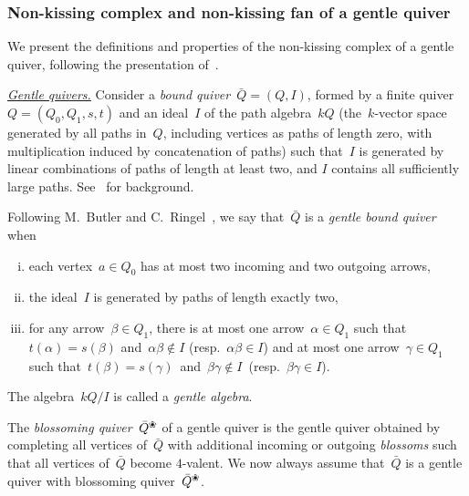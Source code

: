 \documentclass{amsart}
\theoremstyle{definition}
\newcommand{\ssm}{\smallsetminus} %
\newcommand{\darkblue}{\color{darkblue}} %
\newcommand{\defn}[1]{\textsl{\darkblue #1}} %
\newcommand{\para}[1]{\medskip\noindent\uline{\textit{#1.}}} %
\newcommand{\quiver}{\bar Q} %
\newcommand{\blossom}{^\text{\ding{96}}} %
\begin{document}
\subsubsection{Non-kissing complex and non-kissing fan of a gentle quiver}

We present the definitions and properties of the non-kissing complex of a gentle quiver, following the presentation of~\cite{PaluPilaudPlamondon-nonkissing}.

\para{Gentle quivers}
%
Consider a \defn{bound quiver}~${\quiver = (Q,I)}$, formed by a finite quiver~$Q = (Q_0, Q_1, s, t)$ and an ideal~$I$ of the path algebra~$kQ$ (the~$k$-vector space generated by all paths in~$Q$, including vertices as paths of length zero, with multiplication induced by concatenation of paths) such that~$I$ is generated by linear combinations of paths of length at least two, and $I$ contains all sufficiently large paths. See~\cite{AssemSimsonSkowronski} for background.

Following M.~Butler and C.~Ringel~\cite{ButlerRingel}, we say that~$\quiver$ is a \defn{gentle bound quiver} when
\begin{enumerate}[(i)]
\item each vertex~$a \in Q_0$ has at most two incoming and two outgoing arrows,
\item the ideal~$I$ is generated by paths of length exactly two,
\item for any arrow~$\beta \in Q_1$, there is at most one arrow~$\alpha \in Q_1$ such that~$t(\alpha) = s(\beta)$ and~${\alpha\beta\notin I}$ (resp.~$\alpha\beta \in I$) and at most one arrow~$\gamma \in Q_1$ such that~$t(\beta) = s(\gamma)$~and~${\beta\gamma\notin I}$~(resp.~${\beta\gamma \in I}$).
\end{enumerate}
The algebra~$kQ/I$ is called a \defn{gentle algebra}.

The \defn{blossoming quiver}~$\quiver\blossom$ of a gentle quiver is the gentle quiver obtained by completing all vertices of~$\quiver$ with additional incoming or outgoing \defn{blossoms} such that all vertices of~$\quiver$ become $4$-valent.
%
%
We now always assume that~$\quiver$ is a gentle quiver with blossoming quiver~$\quiver\blossom$.
\end{document}
